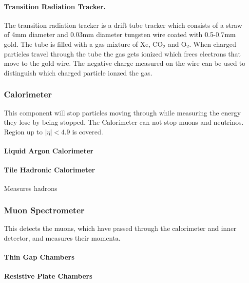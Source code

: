 \documentclass[12pt,a4paper]{article}
\begin{document}
\paragraph{Transition Radiation Tracker.}
The transition radiation tracker is a drift tube tracker which consists of a straw of 4mm diameter and 0.03mm diameter tungsten wire coated with 0.5-0.7mm gold. The tube is filled with a gas mixture of Xe, $\mathrm{CO_{2}}$ and $\mathrm{O_{2}}$. When charged particles travel through the tube the gas gets ionized which frees electrons that move to the gold wire. The negative charge measured on the wire can be used to distinguish which charged particle ionzed the gas. 

\subsubsection{Calorimeter}
This component will stop particles moving through while measuring the
energy they lose by being stopped. %
The Calorimeter can not stop muons and neutrinos. Region up to $|\eta| < 4.9 $ is covered.

\paragraph{Liquid Argon Calorimeter}
\paragraph{Tile Hadronic Calorimeter}
Measures hadrons
\subsubsection{Muon Spectrometer}
This detects the muons, which have passed through the calorimeter and inner
detector, and measures their momenta.

\paragraph{Thin Gap Chambers}
\paragraph{Resistive Plate Chambers}
\end{document}
